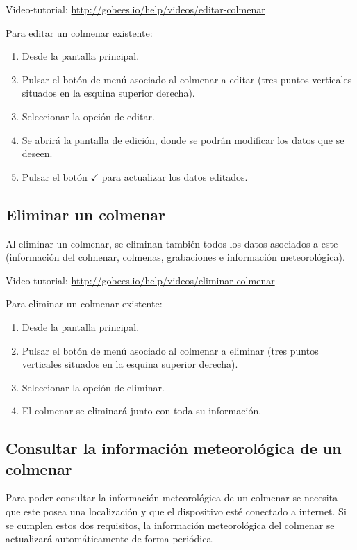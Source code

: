 Video-tutorial: \url{http://gobees.io/help/videos/editar-colmenar}

Para editar un colmenar existente:

\begin{enumerate}
\def\labelenumi{\arabic{enumi}.}
\tightlist
\item
  Desde la pantalla principal.
\item
  Pulsar el botón de menú asociado al colmenar a editar (tres puntos
  verticales situados en la esquina superior derecha).
\item
  Seleccionar la opción de editar.
\item
  Se abrirá la pantalla de edición, donde se podrán modificar los datos
  que se deseen.
\item
  Pulsar el botón {$\checkmark$} para actualizar los datos editados.
\end{enumerate}

\subsection{Eliminar un colmenar}\label{eliminar-un-colmenar}

Al eliminar un colmenar, se eliminan también todos los datos asociados a
este (información del colmenar, colmenas, grabaciones e información
meteorológica).

Video-tutorial: \url{http://gobees.io/help/videos/eliminar-colmenar}

Para eliminar un colmenar existente:

\begin{enumerate}
\def\labelenumi{\arabic{enumi}.}
\tightlist
\item
  Desde la pantalla principal.
\item
  Pulsar el botón de menú asociado al colmenar a eliminar (tres puntos
  verticales situados en la esquina superior derecha).
\item
  Seleccionar la opción de eliminar.
\item
  El colmenar se eliminará junto con toda su información.
\end{enumerate}

\subsection{Consultar la información meteorológica de un
colmenar}\label{consultar-la-informaciuxf3n-meteoroluxf3gica-de-un-colmenar}

Para poder consultar la información meteorológica de un colmenar se
necesita que este posea una localización y que el dispositivo esté
conectado a internet. Si se cumplen estos dos requisitos, la información
meteorológica del colmenar se actualizará automáticamente de forma
periódica.

